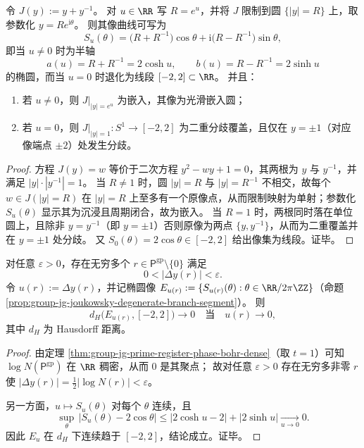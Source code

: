 \begin{proposition}\label{prop:group-jg-joukowsky-degenerate-branch-segment}
令 \(J(y):=y+y^{-1}\)。
对 \(u\in\RR\) 写 \(R=e^{u}\)，并将 \(J\) 限制到圆 \(\{|y|=R\}\) 上，取参数化 \(y=Re^{\mathrm{i}\theta}\)。
则其像曲线可写为
\[
S_u(\theta)
=\bigl(R+R^{-1}\bigr)\cos\theta+\mathrm{i}\bigl(R-R^{-1}\bigr)\sin\theta,
\]
即当 \(u\neq 0\) 时为半轴
\[
a(u)=R+R^{-1}=2\cosh u,\qquad b(u)=R-R^{-1}=2\sinh u
\]
的椭圆，而当 \(u=0\) 时退化为线段 \([-2,2]\subset\RR\)。
并且：
\begin{enumerate}
  \item 若 \(u\neq 0\)，则 \(J|_{|y|=e^{u}}\) 为嵌入，其像为光滑嵌入圆；
  \item 若 \(u=0\)，则 \(J|_{|y|=1}:S^1\to[-2,2]\) 为二重分歧覆盖，且仅在 \(y=\pm 1\)（对应像端点 \(\pm 2\)）处发生分歧。
\end{enumerate}
\end{proposition}
\begin{proof}
方程 \(J(y)=w\) 等价于二次方程 \(y^2-wy+1=0\)，其两根为 \(y\) 与 \(y^{-1}\)，并满足 \(|y|\cdot|y^{-1}|=1\)。
当 \(R\neq 1\) 时，圆 \(|y|=R\) 与 \(|y|=R^{-1}\) 不相交，故每个 \(w\in J(|y|=R)\) 在 \(|y|=R\) 上至多有一个原像点，从而限制映射为单射；参数化 \(S_u(\theta)\) 显示其为沉浸且周期闭合，故为嵌入。
当 \(R=1\) 时，两根同时落在单位圆上，且除非 \(y=y^{-1}\)（即 \(y=\pm 1\)）否则原像为两点 \(\{y,y^{-1}\}\)，从而为二重覆盖并在 \(y=\pm 1\) 处分歧。
又 \(S_0(\theta)=2\cos\theta\in[-2,2]\) 给出像集为线段。证毕。
\end{proof}



\begin{corollary}\label{cor:group-jg-prime-register-degenerate-approx}
对任意 \(\varepsilon>0\)，存在无穷多个 \(r\in \mathsf{P}^{\mathrm{gp}}\setminus\{0\}\) 满足
\[
0<|\Delta y(r)|<\varepsilon.
\]
令 \(u(r):=\Delta y(r)\)，并记椭圆像 \(E_{u(r)}:=\{S_{u(r)}(\theta):\theta\in\RR/2\pi\ZZ\}\)（命题 \ref{prop:group-jg-joukowsky-degenerate-branch-segment}）。
则
\[
d_H\bigl(E_{u(r)},[-2,2]\bigr)\longrightarrow 0
\quad\text{当}\quad u(r)\to 0,
\]
其中 \(d_H\) 为 Hausdorff 距离。
\end{corollary}
\begin{proof}
由定理 \ref{thm:group-jg-prime-register-phase-bohr-dense}（取 \(t=1\)）可知 \(\log N(\mathsf{P}^{\mathrm{gp}})\) 在 \(\RR\) 稠密，从而 \(0\) 是其聚点；
故对任意 \(\varepsilon>0\) 存在无穷多非零 \(r\) 使 \(|\Delta y(r)|=\tfrac12|\log N(r)|<\varepsilon\)。
\par
另一方面，\(u\mapsto S_u(\theta)\) 对每个 \(\theta\) 连续，且
\[
\sup_{\theta}\,|S_u(\theta)-2\cos\theta|
\le |2\cosh u-2|+|2\sinh u|
\xrightarrow[u\to 0]{}0.
\]
因此 \(E_u\) 在 \(d_H\) 下连续趋于 \([-2,2]\)，结论成立。证毕。
\end{proof}

